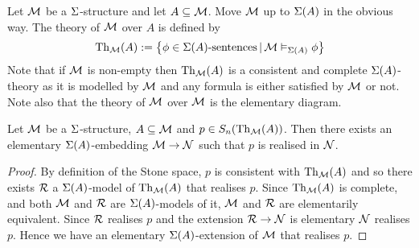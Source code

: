\begin{dfn}
    Let $\mathcal{M}$ be a $\Sigma$-structure and let $A \subseteq {\mathcal{M}}$.
    Move $\mathcal{M}$ up to $\Sigma(A)$ in the obvious way. 
    The theory of $\mathcal{M}$ over $A$ is defined by
    \[\mathrm{Th}_{\mathcal{M}}(A):= 
    \left\{\phi \in \Sigma(A)\text{-sentences} \,|\, \mathcal{M} \vDash_{\Sigma(A)} \phi\right\}\]
    Note that if $\mathcal{M}$ is non-empty then 
    $\mathrm{Th}_{\mathcal{M}}(A)$ is a consistent and complete $\Sigma(A)$-theory
    as it is modelled by $\mathcal{M}$ 
    and any formula is either satisfied by $\mathcal{M}$ or not.
    Note also that the theory of $\mathcal{M}$ over 
    ${\mathcal{M}}$ is the elementary diagram.
\end{dfn}

\begin{lem}
    Let $\mathcal{M}$ be a $\Sigma$-structure, 
    $A \subseteq \mathcal{M}$ and $p \in S_n(\mathrm{Th}_{\mathcal{M}}(A))$.
    Then there exists an elementary $\Sigma(A)$-embedding $\mathcal{M} \to \mathcal{N}$ such that 
    $p$ is realised in $\mathcal{N}$.
\end{lem}
\begin{proof}
    By definition of the Stone space, 
    $p$ is consistent with $\mathrm{Th}_{\mathcal{M}}(A)$ and so there exists $\mathcal{R}$
    a $\Sigma(A)$-model of $\mathrm{Th}_{\mathcal{M}}(A)$ that realises $p$.
    Since $\mathrm{Th}_{\mathcal{M}}(A)$ is complete, 
    and both $\mathcal{M}$ and $\mathcal{R}$ are $\Sigma(A)$-models of it,
    $\mathcal{M}$ and $\mathcal{R}$ are elementarily equivalent.
    Since $\mathcal{R}$ realises $p$ and the extension $\mathcal{R} \to \mathcal{N}$ is elementary 
    $\mathcal{N}$ realises $p$.
    Hence we have an elementary $\Sigma(A)$-extension of $\mathcal{M}$ that realises $p$.
\end{proof}

